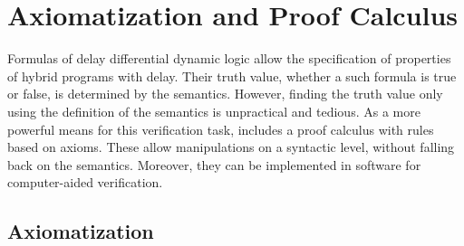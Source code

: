 \chapter{Axiomatization and Proof Calculus}
\label{ch:axiomatization-proof-calculus}

Formulas of delay differential dynamic logic allow the specification of properties of hybrid programs with delay. Their truth value, whether a such formula is true or false, is determined by the semantics. However, finding the truth value only using the definition of the semantics is unpractical and tedious. As a more powerful means for this verification task, \ddL includes a proof calculus with rules based on axioms. These allow manipulations on a syntactic level, without falling back on the semantics.
Moreover, they can be implemented in software for computer-aided verification.

\section{Axiomatization}
    \label{sec:axiomatization}

    \newsavebox{\Rval}%
    \sbox{\Rval}{$\scriptstyle\R$}

